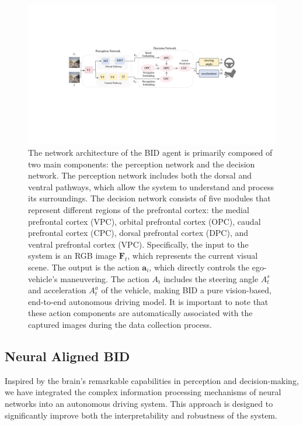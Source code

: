 \begin{figure}[t]
	\centering
	\includegraphics[width=\linewidth]{fig/net.pdf}
	\caption{The network architecture of the BID agent is primarily composed of two main components: the perception network and the decision network.
	The perception network includes both the dorsal and ventral pathways, which allow the system to understand and process its surroundings.
	The decision network consists of five modules that represent different regions of the prefrontal cortex: the medial prefrontal cortex (VPC), orbital prefrontal cortex (OPC), caudal prefrontal cortex (CPC), dorsal prefrontal cortex (DPC), and ventral prefrontal cortex (VPC). 
	Specifically, the input to the system is an RGB image $ \mathbf{F}_{t} $, which represents the current visual scene.
	The output is the action $\mathbf{a}_{i}$, which directly controls the ego-vehicle's maneuvering.
	The action $A_\text{t}$ includes the steering angle $ A_t^s $ and acceleration $ A_t^a $ of the vehicle, making BID a pure vision-based, end-to-end autonomous driving model.
	It is important to note that these action components are automatically associated with the captured images during the data collection process.
	}
	\label{fig:fig2}
\end{figure}


\subsection{Neural Aligned BID}
\hspace{1pc} Inspired by the brain's remarkable capabilities in perception and decision-making, we have integrated the complex information processing mechanisms of neural networks into an autonomous driving system. 
This approach is designed to significantly improve both the interpretability and robustness of the system.

